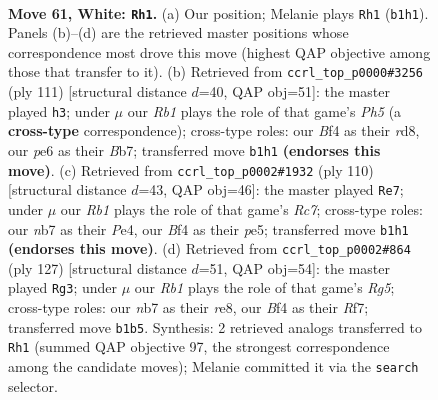 \documentclass[11pt]{article}
\begin{document}
\clearpage

\begin{figure}[p]\centering
\begin{subfigure}{0.46\textwidth}\centering
\resizebox{\linewidth}{!}{%
\newchessgame
\chessboard[
  setfen={7r/pn5k/1pr1p3/7p/2PKPB2/6P1/P1N2R2/1R6 w - - 4 61},
  showmover=false,
  pgfstyle=straightmove, color=movearrow, markmove={b1-h1}
]}
\caption{}
\end{subfigure}\hfill
\begin{subfigure}{0.46\textwidth}\centering
\resizebox{\linewidth}{!}{%
\newchessgame
\chessboard[
  setfen={3R4/1br5/p4k2/2P2n2/RPK3pp/8/P4P1P/8 b - - 1 56},
  showmover=false,
  pgfstyle=straightmove, color=movearrow, markmove={h4-h3}
]}
\caption{}
\end{subfigure}
\\[4pt]
\begin{subfigure}{0.46\textwidth}\centering
\resizebox{\linewidth}{!}{%
\newchessgame
\chessboard[
  setfen={3R4/2R3pk/p4r2/1p2p2p/4P2P/r2PK1P1/8/8 w - - 4 56},
  showmover=false,
  pgfstyle=straightmove, color=movearrow, markmove={c7-e7}
]}
\caption{}
\end{subfigure}\hfill
\begin{subfigure}{0.46\textwidth}\centering
\resizebox{\linewidth}{!}{%
\newchessgame
\chessboard[
  setfen={4R3/5r2/1p6/p2k4/P4prp/2P5/KP3RP1/8 b - - 17 64},
  showmover=false,
  pgfstyle=straightmove, color=movearrow, markmove={g4-g3}
]}
\caption{}
\end{subfigure}
\caption{\textbf{Move 61, White: \texttt{Rh1}.} (a) Our position; Melanie plays \texttt{Rh1} (\texttt{b1h1}). Panels (b)--(d) are the retrieved master positions whose correspondence most drove this move (highest QAP objective among those that transfer to it). (b) Retrieved from \texttt{ccrl\_top\_p0000\#3256} (ply 111) [structural distance $d$=40, QAP obj=51]: the master played \texttt{h3}; under $\mu$ our \emph{Rb1} plays the role of that game's \emph{Ph5} (a \textbf{cross-type} correspondence); cross-type roles: our \emph{B}f4 as their \emph{r}d8, our \emph{p}e6 as their \emph{B}b7; transferred move \texttt{b1h1} \textbf{(endorses this move)}. (c) Retrieved from \texttt{ccrl\_top\_p0002\#1932} (ply 110) [structural distance $d$=43, QAP obj=46]: the master played \texttt{Re7}; under $\mu$ our \emph{Rb1} plays the role of that game's \emph{Rc7}; cross-type roles: our \emph{n}b7 as their \emph{P}e4, our \emph{B}f4 as their \emph{p}e5; transferred move \texttt{b1h1} \textbf{(endorses this move)}. (d) Retrieved from \texttt{ccrl\_top\_p0002\#864} (ply 127) [structural distance $d$=51, QAP obj=54]: the master played \texttt{Rg3}; under $\mu$ our \emph{Rb1} plays the role of that game's \emph{Rg5}; cross-type roles: our \emph{n}b7 as their \emph{r}e8, our \emph{B}f4 as their \emph{R}f7; transferred move \texttt{b1b5}. Synthesis: 2 retrieved analogs transferred to \texttt{Rh1} (summed QAP objective 97, the strongest correspondence among the candidate moves); Melanie committed it via the \texttt{search} selector.}
\label{fig:thought-m120}
\end{figure}
\end{document}
